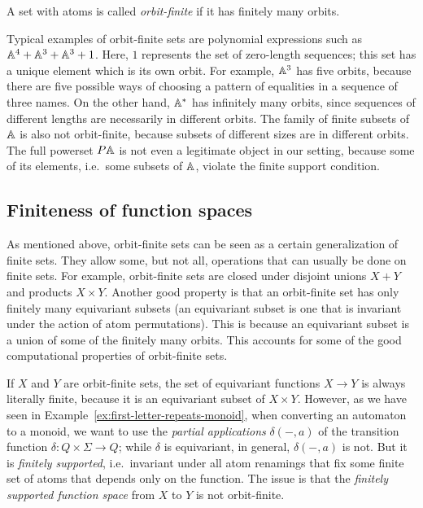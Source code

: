 \documentclass[a4paper,UKenglish,cleveref, autoref, numberwithinsect, thm-restate]{lipics-v2021}
\begin{document}
\begin{definition}
    A set with atoms is called \emph{orbit-finite} if it has finitely many orbits. 
\end{definition}

Typical examples of orbit-finite sets are polynomial expressions such as $\mathbb A^4 + \mathbb A^3 + \mathbb A^3 + 1$. Here, $1$ represents the set of zero-length sequences; this set has a unique element which is its own orbit.  For  example,  $\mathbb A^3$ has five orbits, because there are five possible ways of choosing a pattern of equalities in a sequence of three names. On the other hand,  $\mathbb A^*$ has infinitely many orbits, since sequences of different lengths are necessarily in different orbits.   The family of finite subsets of $\mathbb A$  is also  not orbit-finite, because subsets of different sizes are in different orbits. The full powerset $\powerset \atoms$ is not even a legitimate object in our setting, because some of its elements, i.e.~some subsets of $\mathbb A$, violate the finite support condition.

\subsection{Finiteness of function spaces}
\label{sec:orbit-finite-function-spaces}
As mentioned above, orbit-finite sets can be seen as  a certain generalization of finite sets. They allow some, but not all, operations that can usually be done on finite sets. For example, orbit-finite sets are closed under disjoint unions $X + Y$ and products $X \times Y$.  Another good property is that an orbit-finite set has only finitely many equivariant subsets (an equivariant subset is one that is invariant under the action of atom permutations). This is because an equivariant subset is a union of some of the finitely many orbits. This accounts for some of the good computational properties of orbit-finite sets.

If $X$ and $Y$ are orbit-finite sets, the set of equivariant functions $X \to Y$ is always literally finite, because it is an equivariant subset of $X\times Y$. However, as we have seen in Example~\ref{ex:first-letter-repeats-monoid}, when converting an automaton to a monoid, we want to use the \emph{partial applications} $\delta(-,a)$ of the transition function $\delta : Q \times \Sigma \to Q$; while $\delta$ is equivariant, in general, $\delta(-,a)$ is not. But it is \emph{finitely supported}, i.e.~invariant under all atom renamings that fix some finite set of atoms that depends only on the function.
The issue is that the \emph{finitely supported function space} from $X$ to $Y$ is not orbit-finite.
\end{document}
